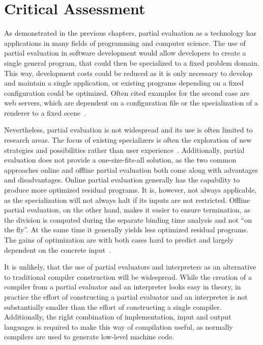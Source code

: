 
\newpage
\section{Critical Assessment}\label{sec:discussion}

As demonstrated in the previous chapters, partial evaluation as a technology has applications in many fields of programming and computer science.
The use of partial evaluation in software development would allow developers to create a single general program, that could then be specialized to a fixed problem domain.
This way, development costs could be reduced as it is only necessary to develop and maintain a single application, or existing programs depending on a fixed configuration could be optimized.
Often cited examples for the second case are web servers, which are dependent on a configuration file or the specialization of a renderer to a fixed scene~\cite{Jones_PartialEvaluation}.

Nevertheless, partial evaluation is not widespread and its use is often limited to research areas.
The focus of existing specializers is often the exploration of new strategies and possibilities rather than user experience~\cite{Cook_TutorialOnlinePartialEvaluation}.
Additionally, partial evaluation does not provide a one-size-fits-all solution, as the two common approaches online and offline partial evaluation both come along with advantages and disadvantages.
Online partial evaluation generally has the capability to produce more optimized residual programs.
It is, however, not always applicable, as the specialization will not always halt if its inputs are not restricted.
Offline partial evaluation, on the other hand, makes it easier to ensure termination, as the division is computed during the separate binding time analysis and not \enquote{on the fly}.
At the same time it generally yields less optimized residual programs.
The gains of optimization are with both cases hard to predict and largely dependent on the concrete input~\cite{Sumii_HybridApproach}.

It is unlikely, that the use of partial evaluators and interpreters as an alternative to traditional compiler construction will be widespread.
While the creation of a compiler from a partial evaluator and an interpreter looks easy in theory, in practice the effort of constructing a partial evaluator and an interpreter is not substantially smaller than the effort of constructing a single compiler.
Additionally, the right combination of implementation, input and output languages is required to make this way of compilation useful, as normally compilers are used to generate low-level machine code.

